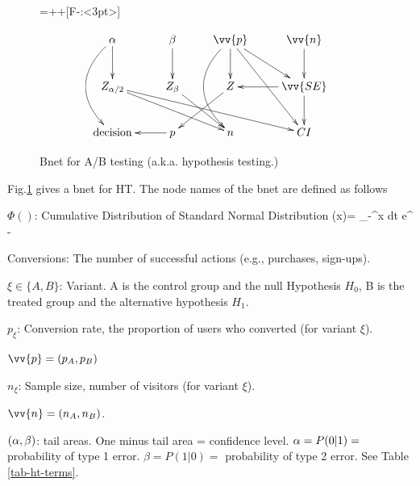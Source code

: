 \begin{figure}[h!]

{\entrymodifiers={++[F-:<3pt>]}

$$\xymatrix@R=25pt{
\alp\ar@/_2pc/[dd]\ar[d]
&
\beta\ar[d]
&
\vv{p}\ar@/_2pc/[dd]
\ar[dr]
\ar[d]
\ar[ddr]
&\vv{n}\ar[d]
\\
Z_{\alp/2}\ar[drr]
\ar[drrr]
&Z_\beta\ar[dr]
&Z\ar[dl]
&\vv{SE}\ar[l]\ar[d]
\\
\text{decision}
&p\ar[l]
&n
&CI
}$$
}
\caption{Bnet for A/B testing (a.k.a. 
hypothesis testing.)}
\label{fig-bnet-hypo-test}
\end{figure}

Fig.\ref{fig-bnet-hypo-test}
gives a bnet for HT. The node names 
of the bnet are defined as follows

$\Phi()$: Cumulative Distribution
of Standard Normal Distribution
\beq
\Phi (x)=
\int_{-\infty}^x dt\; e^{
-}
\eeq

Conversions: The number of successful actions (e.g., purchases, sign-ups). 

$\xi\in\{A,B\}$: Variant. A is the control group
and the null Hypothesis $H_0$, B is 
the treated group
and the alternative hypothesis $H_1$.
 
$p_\xi$: Conversion rate, the proportion of users who converted (for variant $\xi$).

$\vv{p}=(p_A, p_B)$

$n_\xi$: Sample size, number of visitors
(for variant $\xi$).
   
$\vv{n}=(n_A, n_B)$.

$(\alpha, \beta)$: tail areas. One minus tail area = confidence level. $\alpha=P(0|1)=$ probability of type 1 error. $\beta=P(1|0)=$
probability of type 2 error. See Table
\ref{tab-ht-terms}.

